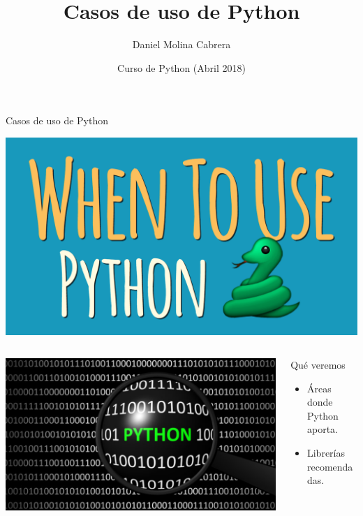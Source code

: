 \documentclass[bigger,unknownkeysallowed]{beamer}
\author{Daniel Molina Cabrera}
\date{Curso de Python (Abril 2018)}
\title{Casos de uso de Python}
\begin{document}
\maketitle
{}
\section{}
\label{sec:orgd214080}

\begin{frame}[label={sec:orgb1da1c2}]{Casos de uso de Python}
\begin{center}
\begin{center}
\includegraphics[width=.7\textwidth]{when.png}
\end{center}
\end{center}


\begin{columns}
\begin{column}{0.4\columnwidth}
\begin{center}
\begin{center}
\includegraphics[width=\textwidth]{python_inside.jpg}
\end{center}
\end{center}
\end{column}
\begin{column}{0.6\columnwidth}
\begin{block}{Qué veremos}
\begin{itemize}
\item Áreas donde Python aporta.

\item Librerías recomendadas.
\end{itemize}
\end{block}
\end{column}
\end{columns}
\end{frame}
\end{document}
